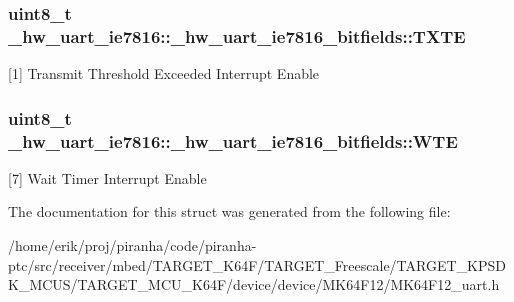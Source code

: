 \subsubsection[{\texorpdfstring{T\+X\+TE}{TXTE}}]{\setlength{\rightskip}{0pt plus 5cm}uint8\+\_\+t \+\_\+hw\+\_\+uart\+\_\+ie7816\+::\+\_\+hw\+\_\+uart\+\_\+ie7816\+\_\+bitfields\+::\+T\+X\+TE}\hypertarget{struct__hw__uart__ie7816_1_1__hw__uart__ie7816__bitfields_a5463b17e6c18622927645fb997a1b27e}{}\label{struct__hw__uart__ie7816_1_1__hw__uart__ie7816__bitfields_a5463b17e6c18622927645fb997a1b27e}
\mbox{[}1\mbox{]} Transmit Threshold Exceeded Interrupt Enable 
\subsubsection[{\texorpdfstring{W\+TE}{WTE}}]{\setlength{\rightskip}{0pt plus 5cm}uint8\+\_\+t \+\_\+hw\+\_\+uart\+\_\+ie7816\+::\+\_\+hw\+\_\+uart\+\_\+ie7816\+\_\+bitfields\+::\+W\+TE}\hypertarget{struct__hw__uart__ie7816_1_1__hw__uart__ie7816__bitfields_a3ace7e918678213cd2e9ab11c9e9e064}{}\label{struct__hw__uart__ie7816_1_1__hw__uart__ie7816__bitfields_a3ace7e918678213cd2e9ab11c9e9e064}
\mbox{[}7\mbox{]} Wait Timer Interrupt Enable 

The documentation for this struct was generated from the following file\+:\begin{DoxyCompactItemize}
\item 
/home/erik/proj/piranha/code/piranha-\/ptc/src/receiver/mbed/\+T\+A\+R\+G\+E\+T\+\_\+\+K64\+F/\+T\+A\+R\+G\+E\+T\+\_\+\+Freescale/\+T\+A\+R\+G\+E\+T\+\_\+\+K\+P\+S\+D\+K\+\_\+\+M\+C\+U\+S/\+T\+A\+R\+G\+E\+T\+\_\+\+M\+C\+U\+\_\+\+K64\+F/device/device/\+M\+K64\+F12/M\+K64\+F12\+\_\+uart.\+h\end{DoxyCompactItemize}
